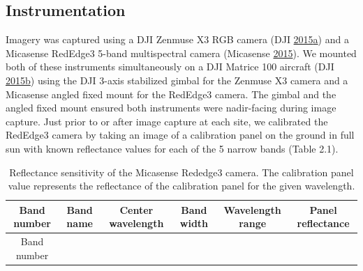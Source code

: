 \documentclass[twoside,12pt,final]{ucthesis-CA2012}
\begin{document}
\begin{ucmainmatter}
\subsection{Instrumentation}\label{instrumentation}

Imagery was captured using a DJI Zenmuse X3 RGB camera (DJI
\protect\hyperlink{ref-dji2015}{2015}\protect\hyperlink{ref-dji2015}{a})
and a Micasense RedEdge3 5-band multispectral camera (Micasense
\protect\hyperlink{ref-micasense2015}{2015}). We mounted both of these
instruments simultaneously on a DJI Matrice 100 aircraft (DJI
\protect\hyperlink{ref-dji2015a}{2015}\protect\hyperlink{ref-dji2015a}{b})
using the DJI 3-axis stabilized gimbal for the Zenmuse X3 camera and a
Micasense angled fixed mount for the RedEdge3 camera. The gimbal and the
angled fixed mount ensured both instruments were nadir-facing during
image capture. Just prior to or after image capture at each site, we
calibrated the RedEdge3 camera by taking an image of a calibration panel
on the ground in full sun with known reflectance values for each of the
5 narrow bands (Table 2.1).
\begin{longtable}[]{@{}cccccc@{}}
\caption{Reflectance sensitivity of the Micasense Rededge3 camera. The
calibration panel value represents the reflectance of the calibration
panel for the given wavelength.}\tabularnewline
\toprule
\begin{minipage}[b]{0.10\columnwidth}\centering\strut
Band number\strut
\end{minipage} & \begin{minipage}[b]{0.23\columnwidth}\centering\strut
Band name\strut
\end{minipage} & \begin{minipage}[b]{0.14\columnwidth}\centering\strut
Center wavelength\strut
\end{minipage} & \begin{minipage}[b]{0.09\columnwidth}\centering\strut
Band width\strut
\end{minipage} & \begin{minipage}[b]{0.14\columnwidth}\centering\strut
Wavelength range\strut
\end{minipage} & \begin{minipage}[b]{0.14\columnwidth}\centering\strut
Panel reflectance\strut
\end{minipage}\tabularnewline
\midrule
\endfirsthead
\toprule
\begin{minipage}[b]{0.10\columnwidth}\centering\strut
Band number\strut
\end{minipage} & \begin{minipage}[b]{0.23\columnwidth}\centering\strut

\end{minipage}
\end{longtable}
\end{ucmainmatter}
\end{document}
